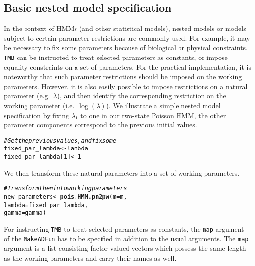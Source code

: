 \documentclass[bimj,fleqn]{w-art}\usepackage[]{graphicx}\usepackage[]{color}
\makeatletter
\newcommand{\hlnum}[1]{\textcolor[rgb]{0.686,0.059,0.569}{#1}}%
\newcommand{\hlcom}[1]{\textcolor[rgb]{0.678,0.584,0.686}{\textit{#1}}}%
\newcommand{\hlstd}[1]{\textcolor[rgb]{0.345,0.345,0.345}{#1}}%
\newcommand{\hlkwb}[1]{\textcolor[rgb]{0.69,0.353,0.396}{#1}}%
\newcommand{\hlkwc}[1]{\textcolor[rgb]{0.333,0.667,0.333}{#1}}%
\newcommand{\hlkwd}[1]{\textcolor[rgb]{0.737,0.353,0.396}{\textbf{#1}}}%
\newenvironment{kframe}{%
 \def\at@end@of@kframe{}%
 \ifinner\ifhmode%
  \def\at@end@of@kframe{\end{minipage}}%
  \begin{minipage}{\columnwidth}%
 \fi\fi%
 \def\FrameCommand##1{\hskip\@totalleftmargin \hskip-\fboxsep
 \colorbox{shadecolor}{##1}\hskip-\fboxsep
     \hskip-\linewidth \hskip-\@totalleftmargin \hskip\columnwidth}%
 \MakeFramed {\advance\hsize-\width
   \@totalleftmargin\z@ \linewidth\hsize
   \@setminipage}}%
 {\par\unskip\endMakeFramed%
 \at@end@of@kframe}
\newenvironment{knitrout}{}{} %
\theoremstyle{plain}
\theoremstyle{definition}
\makeatother
\begin{document}
\subsection{Basic nested model specification}
\label{sec:nested}

In the context of HMMs (and other statistical models), nested  models or models subject to certain parameter restrictions are commonly used. For example, it may be necessary to fix some parameters because of biological or physical constraints.  {\tt{TMB}} can be instructed to treat selected parameters as constants, or impose equality constraints on a set of parameters.
For the practical implementation, it is noteworthy that such parameter restrictions should be imposed on the working parameters.
However, it is also easily possible to impose restrictions on a natural parameter (e.g.~$\lambda$), and then identify the corresponding restriction on the working parameter (i.e.~$\log(\lambda)$). We illustrate a simple nested model specification by fixing $\lambda_1$ to one in our two-state Poisson HMM, the other parameter components correspond to the previous initial values. 
\begin{knitrout}
\color{fgcolor}\begin{kframe}
\begin{alltt}
\hlcom{# Get the previous values, and fix some}
\hlstd{fixed_par_lambda} \hlkwb{<-} \hlstd{lambda}
\hlstd{fixed_par_lambda[}\hlnum{1}\hlstd{]} \hlkwb{<-} \hlnum{1}
\end{alltt}
\end{kframe}
\end{knitrout}
We then transform these natural parameters into a set of working parameters.
\begin{knitrout}
\color{fgcolor}\begin{kframe}
\begin{alltt}
\hlcom{# Transform them into working parameters}
\hlstd{new_parameters} \hlkwb{<-} \hlkwd{pois.HMM.pn2pw}\hlstd{(}\hlkwc{m} \hlstd{= m,}
                                 \hlkwc{lambda} \hlstd{= fixed_par_lambda,}
                                 \hlkwc{gamma} \hlstd{= gamma)}
\end{alltt}
\end{kframe}
\end{knitrout}
For instructing {\tt{TMB}} to treat selected parameters as constants, the \texttt{map} argument of the \texttt{MakeADFun} has to be specified in addition to the usual arguments. The \texttt{map} argument is a list consisting factor-valued vectors which possess the same length as the working parameters and carry their names as well. 
\end{document}
